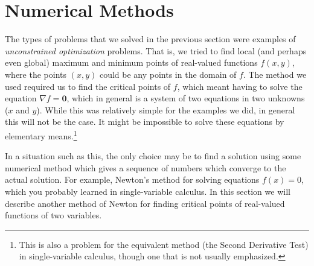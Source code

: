 \section{Numerical Methods}
The types of problems that we solved in the previous section were examples of \emph{unconstrained optimization}
problems. That is, we tried to find local (and perhaps even global) maximum and minimum points of real-valued
functions $f(x,y)$, where the points $(x,y)$ could be any points in the domain of $f$. 
The method we used required us to find the critical points of $f$, which meant having to solve the equation
$\nabla f = \textbf{0}$, which in general is a system of two equations in two unknowns ($x$ and $y$). 
While this was relatively simple for the examples we did, in general this will not be the case. 
It might be impossible to solve these equations 
by elementary means.\footnote{This is also a problem
for the equivalent method (the Second Derivative Test) in single-variable calculus, though one that is not usually
emphasized.}

In a situation such as this, the
only choice may be to find a solution using some numerical method which gives a sequence of numbers which
converge to the actual solution. For example, Newton's method for solving equations $f(x) = 0$, which you probably
learned in single-variable calculus. In this section we will describe another method of Newton for
finding critical points of real-valued functions of two variables.

